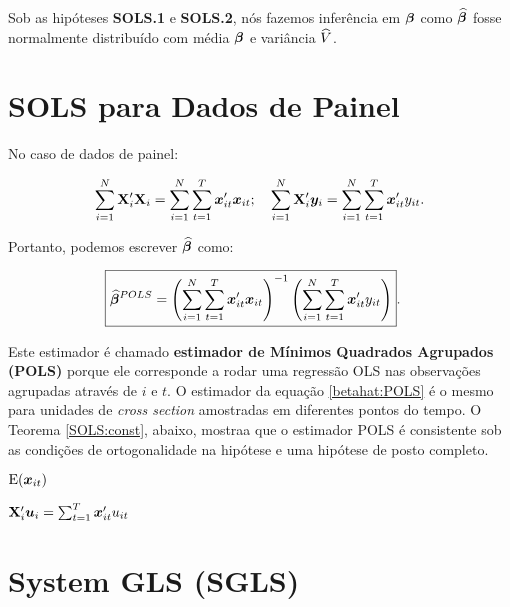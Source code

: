 \documentclass[11pt, oneside, a4paper, article]{article}
\numberwithin{equation}{section}
\begin{document}
Sob as hipóteses \textbf{SOLS.1} e \textbf{SOLS.2}, nós fazemos inferência em $\boldsymbol{\beta}$ como $\widehat{\boldsymbol{\beta}}$ fosse normalmente distribuído com média $\boldsymbol{\beta}$ e variância $\widehat{V}$.


\clearpage
\section{SOLS para Dados de Painel}
\noindent
\citet[Sec.7.8 -- The Linar Panel Data Model, Revisited. p.169]{wool-2010} 

No caso de dados de painel:

\vspace{-1 em}
\begin{align*}
\sum_{i=1}^{N} \mathbf{X}_{i}' \mathbf{X}_{i}
=
\sum_{i=1}^{N} \sum_{t=1}^{T} \boldsymbol{x}_{it}' \boldsymbol{x}_{it};
\quad
\sum_{i=1}^{N} \mathbf{X}_{i}' \boldsymbol{y}_{i}
=
\sum_{i=1}^{N} \sum_{t=1}^{T} \boldsymbol{x}_{it}' y_{it}.
\end{align*}

Portanto, podemos escrever $\widehat{\boldsymbol{\beta}}$ como:

\vspace{-1 em}
\begin{align} \label{betahat:POLS}
\Aboxed{
\betahatbold^{POLS} =
\left( \sum_{i=1}^{N} \sum_{t=1}^{T} \mbs{x}_{it}' \mbs{x}_{it} \right)^{-1}
\left( \sum_{i=1}^{N} \sum_{t=1}^{T} \mbs{x}_{it}' y_{it} \right)
}.
\end{align}

Este estimador é chamado \textbf{estimador de Mínimos Quadrados Agrupados (POLS)} porque ele corresponde a rodar uma regressão OLS nas observações agrupadas através de $i$ e $t$. 
O estimador da equação \eqref{betahat:POLS} é o mesmo para unidades de \textit{cross section} amostradas em diferentes pontos do tempo.
O Teorema \ref{SOLS:const}, abaixo, mostraa que o estimador POLS é consistente sob as condições de ortogonalidade na hipótese  e uma hipótese de posto completo.

$\text{E}(\boldsymbol{x}_{it})$

$\mathbf{X}_{i}' \boldsymbol{u}_{i} = \sum_{t=1}^{T} \boldsymbol{x}_{it}' u_{it}$




\clearpage
\section{System GLS (SGLS)}
\end{document}
